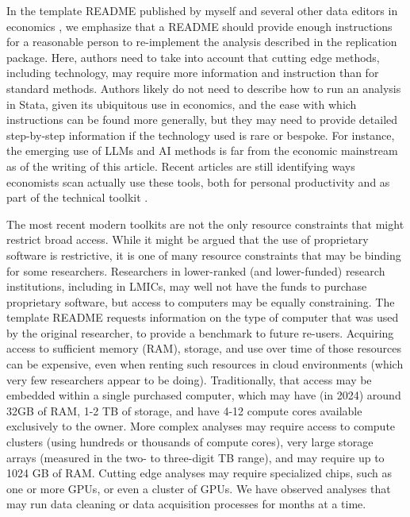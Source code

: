 \documentclass{article}
\begin{document}
{In the template README published by myself and several other data editors in economics \parencite{templateREADMEv1.1}, we emphasize that a README should provide enough instructions for a reasonable person to re-implement the analysis described in the replication package. Here, authors need to take into account that cutting edge methods, including technology, may require more information and instruction than for standard methods. Authors likely do not need to describe how to run an analysis in Stata, given its ubiquitous use in economics, and the ease with which instructions can be found more generally, but they may need to provide detailed step-by-step information if the technology used is rare or bespoke. For instance, the emerging use of \acp{LLM} and \ac{AI} methods is far from the economic mainstream as of the writing of this article. Recent articles are still identifying ways economists scan actually use these tools, both for personal productivity \parencite{korinek_generative_2023} and as part of the technical toolkit \parencite{athey_machine_2019,dell_deep_2024}. 

The most recent modern toolkits are not the only resource constraints that might restrict broad access. While it might be argued that the use of proprietary software is restrictive, it is one of many resource constraints that may be binding for some researchers. Researchers in lower-ranked (and lower-funded) research institutions, including in \acp{LMIC}, may well not have the funds to purchase proprietary software, but access to computers may be equally constraining. The template README requests information on the type of computer that was used by the original researcher, to provide a benchmark to future re-users. Acquiring access to sufficient memory (\ac{RAM}), storage, and use over time of those resources can be expensive, even when renting such resources in cloud environments (which very few researchers appear to be doing). Traditionally, that access may be embedded within a single purchased computer, which may have (in 2024) around 32GB of RAM, 1-2 TB of storage, and have 4-12 compute cores available exclusively to the owner. More complex analyses may require access to compute clusters (using hundreds or thousands of compute cores), very large storage arrays (measured in the two- to three-digit TB range), and may require up to 1024 GB of RAM. Cutting edge analyses may require specialized chips, such as one or more \acp{GPU}, or even a cluster of \acp{GPU}. We have observed analyses that may run data cleaning or data acquisition processes for months at a time. 

}
\end{document}
